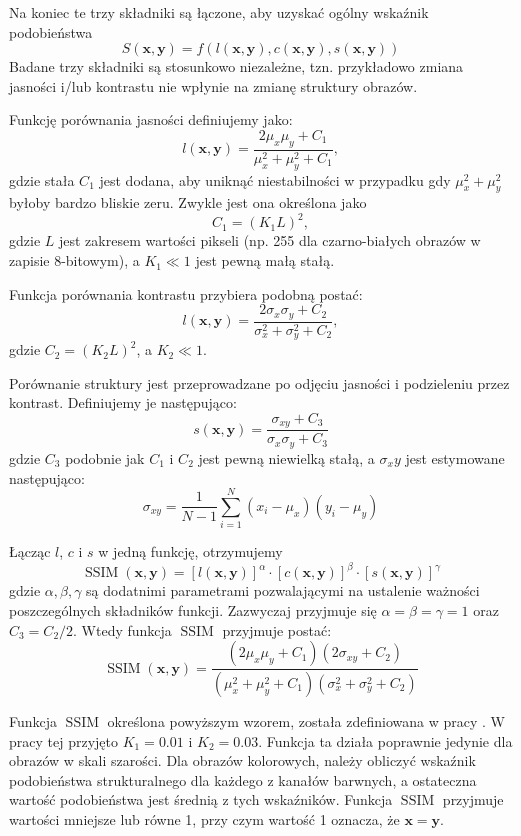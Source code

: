 \documentclass[12pt]{mwbk}
\theoremstyle{plain}
\theoremstyle{definition}
\theoremstyle{remark}
\begin{document}
Na koniec te trzy składniki są łączone, aby uzyskać ogólny wskaźnik podobieństwa
$$S(\mathbf{x},\mathbf{y})=f(l(\mathbf{x}, \mathbf{y}),c(\mathbf{x}, \mathbf{y}),s(\mathbf{x}, \mathbf{y}) )$$
Badane trzy składniki są stosunkowo niezależne, tzn. przykładowo zmiana jasności i/lub kontrastu nie wpłynie na zmianę struktury obrazów.

Funkcję porównania jasności definiujemy jako:
$$l(\mathbf{x}, \mathbf{y})= \frac{2\mu_x\mu_y+C_1}{\mu_x^2+\mu_y^2+C_1},$$
gdzie stała $C_1$ jest dodana, aby uniknąć niestabilności w przypadku gdy $\mu_x^2+\mu_y^2$ byłoby bardzo bliskie zeru. Zwykle jest ona określona jako
$$C_1=(K_1L)^2,$$
gdzie $L$ jest zakresem wartości pikseli (np. 255 dla czarno-białych obrazów w zapisie 8-bitowym), a $K_1\ll1$ jest pewną małą stałą. 

Funkcja porównania kontrastu przybiera podobną postać:
$$l(\mathbf{x}, \mathbf{y})= \frac{2\sigma_x \sigma_y+C_2}{\sigma_x^2+\sigma_y^2+C_2},$$
gdzie $C_2=(K_2L)^2$, a $K_2\ll1$.

Porównanie struktury jest przeprowadzane po odjęciu jasności i podzieleniu przez kontrast. Definiujemy je następująco:
$$s(\mathbf{x}, \mathbf{y})=\frac{\sigma_{xy}+C_3}{\sigma_x \sigma_y+C_3}$$
gdzie $C_3$ podobnie jak $C_1$ i $C_2$ jest pewną niewielką stałą, a $\sigma_xy$ jest estymowane następująco:
$$\sigma_{xy}=\frac{1}{N-1}\sum_{i=1}^N (x_i-\mu_x)(y_i-\mu_y)$$

Łącząc $l$, $c$ i $s$ w jedną funkcję, otrzymujemy
$$\operatorname{SSIM}(\mathbf{x}, \mathbf{y})=[l(\mathbf{x}, \mathbf{y})]^{\alpha}\cdot [c(\mathbf{x}, \mathbf{y})]^{\beta} \cdot [s(\mathbf{x}, \mathbf{y})]^{\gamma}$$
gdzie $\alpha, \beta, \gamma$ są dodatnimi parametrami pozwalającymi na ustalenie ważności poszczególnych składników funkcji. Zazwyczaj przyjmuje się $\alpha=\beta=\gamma=1$ oraz $C_3=C_2/2$. Wtedy funkcja $\operatorname{SSIM}$ przyjmuje postać:
$$\operatorname{SSIM}(\mathbf{x}, \mathbf{y})=\frac{(2\mu_x\mu_y+C_1)(2\sigma_{xy}+C_2)}{(\mu_x^2+\mu_y^2+C_1)(\sigma_x^2+\sigma_y^2+C_2)}$$

Funkcja $\operatorname{SSIM}$ określona powyższym wzorem, została zdefiniowana w pracy \cite{wang}. W pracy tej przyjęto $K_1=0.01$ i $K_2=0.03$. Funkcja ta działa poprawnie jedynie dla obrazów w skali szarości. Dla obrazów kolorowych, należy obliczyć wskaźnik podobieństwa strukturalnego dla każdego z kanałów barwnych, a ostateczna wartość podobieństwa jest średnią z tych wskaźników. Funkcja $\operatorname{SSIM}$ przyjmuje wartości mniejsze lub równe 1, przy czym wartość 1 oznacza, że $\mathbf{x}=\mathbf{y}$.
\end{document}
